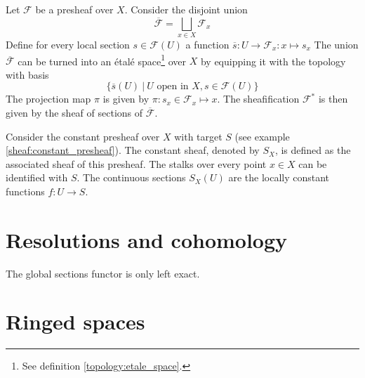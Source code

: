	\begin{construct}\label{sheaf:etale_construction}
		Let $\mathcal{F}$ be a presheaf over $X$. Consider the disjoint union
		\begin{equation}
			\overline{\mathcal{F}} = \bigsqcup_{x\in X}\mathcal{F}_x
		\end{equation}
		Define for every local section $s\in\mathcal{F}(U)$ a function $\overline{s}:U\rightarrow\mathcal{F}_x:x\mapsto s_x$ The union $\overline{\mathcal{F}}$ can be turned into an \'etal\'e space\footnote{See definition \ref{topology:etale_space}.} over $X$ by equipping it with the topology with basis
		\begin{equation}
			\{\overline{s}(U)\ |\ U\text{ open in }X, s\in\mathcal{F}(U)\}
		\end{equation}
		The projection map $\pi$ is given by $\pi:s_x\in\mathcal{F}_x\mapsto x$. The sheafification $\mathcal{F}^\ast$ is then given by the sheaf of sections of $\overline{\mathcal{F}}$.
	\end{construct}
	
	\begin{example}
		Consider the constant presheaf over $X$ with target $S$ (see example \ref{sheaf:constant_presheaf}). The constant sheaf, denoted by $S_X$, is defined as the associated sheaf of this presheaf. The stalks over every point $x\in X$ can be identified with $S$. The continuous sections $S_X(U)$ are the locally constant functions $f:U\rightarrow S$.
	\end{example}
	
\section{Resolutions and cohomology}

	\begin{property}
		The global sections functor is only left exact.
	\end{property}
	
\section{Ringed spaces}

